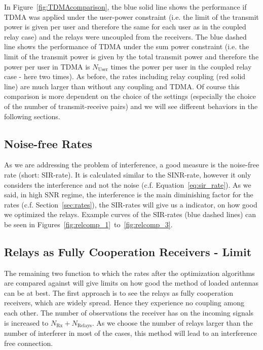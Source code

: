 In Figure~\ref{fig:TDMAcomparison}, the blue solid line shows the performance if TDMA was applied under the user-power constraint (i.e. the limit of the transmit power is given per user and therefore the same for each user as in the coupled relay case) and the relays were uncoupled from the receivers.
The blue dashed line shows the performance of TDMA under the sum power constraint (i.e. the limit of the transmit power is given by the total transmit power and therefore the power per user in TDMA is $N_\text{User}$ times the power per user in the coupled relay case - here two times).
As before, the rates including relay coupling (red solid line) are much larger than without any coupling and TDMA.
Of course this comparison is more dependent on the choice of the settings (especially the choice of the number of transmit-receive pairs) and we will see different behaviors in the following sections. 

\subsection{Noise-free Rates}
\label{sec:sir}
As we are addressing the problem of interference, a good measure is the noise-free rate (short: SIR-rate).
It is calculated similar to the SINR-rate, however it only considers the interference and not the noise (c.f. Equation~\eqref{eq:sir_rate}).
As we said, in high SNR regime, the interference is the main diminishing factor for the rates (c.f. Section~\ref{sec:rates}), the SIR-rates will give us a indicator, on how good we optimized the relays.
Example curves of the SIR-rates (blue dashed lines) can be seen in Figures~\ref{fig:relcomp_1}~to~\ref{fig:relcomp_3}.

\subsection{Relays as Fully Cooperation Receivers - Limit}
\label{sec:fullrx_limit}
The remaining two function to which the rates after the optimization algorithms are compared against will give limits on how good the method of loaded antennas can be at best.
The first approach is to see the relays as fully cooperation receivers, which are widely spread.
Hence they experience no coupling among each other.
The number of observations the receiver has on the incoming signals is increased to $N_\text{Rx} + N_\text{Relays}$.
As we choose the number of relays larger than the number of interferer in most of the cases, this method will lead to an interference free connection.

